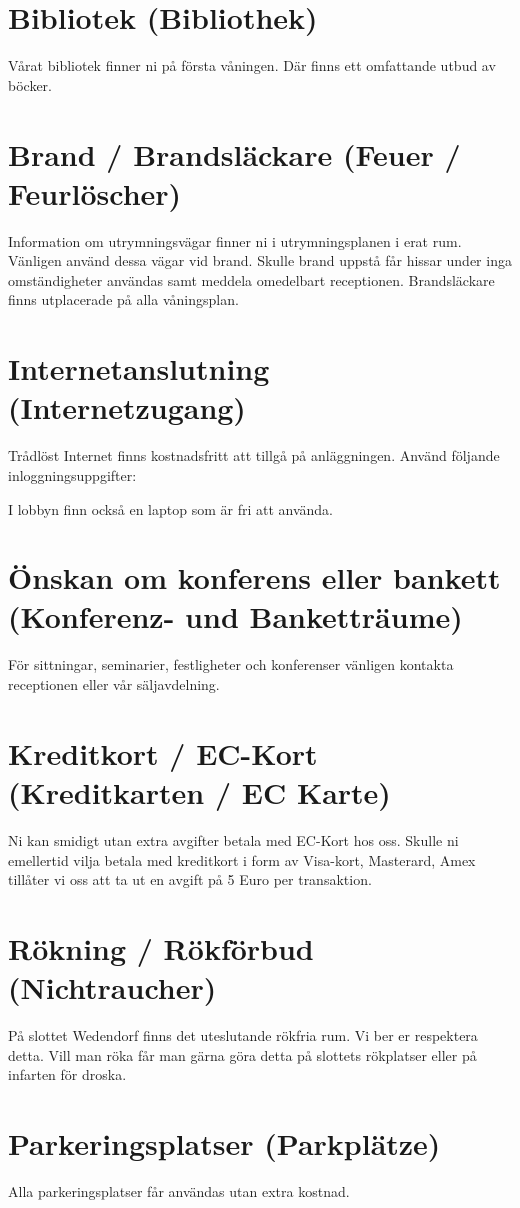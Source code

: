 \documentclass{report}
\begin{document}
\section{Bibliotek (Bibliothek)}
Vårat bibliotek finner ni på första våningen. Där finns ett omfattande utbud av böcker.

\section{Brand / Brandsläckare (Feuer / Feurlöscher)}
Information om utrymningsvägar finner ni i utrymningsplanen i erat rum. Vänligen använd dessa vägar vid brand.
Skulle brand uppstå får hissar under inga omständigheter användas samt meddela omedelbart receptionen.
Brandsläckare finns utplacerade på alla våningsplan.

\section{Internetanslutning (Internetzugang)}
Trådlöst Internet finns kostnadsfritt att tillgå på anläggningen. Använd följande inloggningsuppgifter:

I lobbyn finn också en laptop som är fri att använda.

\section{Önskan om konferens eller bankett (Konferenz- und Banketträume)}
För sittningar, seminarier, festligheter och konferenser vänligen kontakta receptionen eller vår säljavdelning.

\section{Kreditkort / EC-Kort (Kreditkarten / EC Karte)}
Ni kan smidigt utan extra avgifter betala med EC-Kort hos oss. Skulle ni emellertid vilja betala med kreditkort
i form av Visa-kort, Masterard, Amex tillåter vi oss att ta ut en avgift på 5 Euro per transaktion.

\section{Rökning / Rökförbud (Nichtraucher)}
På slottet Wedendorf finns det uteslutande rökfria rum. Vi ber er respektera detta. Vill man röka får man gärna
göra detta på slottets rökplatser eller på infarten för droska.

\section{Parkeringsplatser (Parkplätze)}
Alla parkeringsplatser får användas utan extra kostnad.
\end{document}
